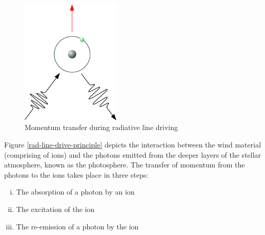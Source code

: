 		\begin{figure}[h!]
			\centering
			\includegraphics[height=6cm]{rad-line-drive-04}
			\caption{Momentum transfer during radiative line driving}
			\label{rad-line-drive-momentum}
		\end{figure}
		Figure \ref{rad-line-drive-principle} depicts the interaction between the wind material (comprising of ions) and the photons emitted from the deeper layers of the stellar atmosphere, known as the photosphere. The transfer of momentum from the photons to the ions takes place in three steps:
		\begin{enumerate}[i.]
			\item The absorption of a photon by an ion
			\item The excitation of the ion
			\item The re-emission of a photon by the ion
		\end{enumerate}
